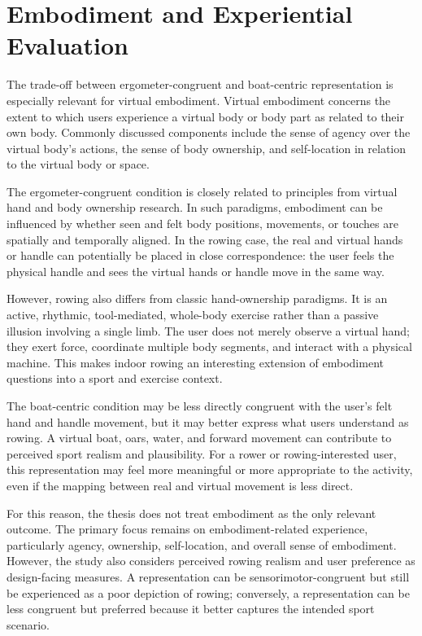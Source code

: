 \section{Embodiment and Experiential Evaluation}
\label{sec:introduction_embodiment_experience}

The trade-off between ergometer-congruent and boat-centric representation is especially relevant for virtual embodiment. Virtual embodiment concerns the extent to which users experience a virtual body or body part as related to their own body. Commonly discussed components include the sense of agency over the virtual body's actions, the sense of body ownership, and self-location in relation to the virtual body or space.

The ergometer-congruent condition is closely related to principles from virtual hand and body ownership research. In such paradigms, embodiment can be influenced by whether seen and felt body positions, movements, or touches are spatially and temporally aligned. In the rowing case, the real and virtual hands or handle can potentially be placed in close correspondence: the user feels the physical handle and sees the virtual hands or handle move in the same way.

However, rowing also differs from classic hand-ownership paradigms. It is an active, rhythmic, tool-mediated, whole-body exercise rather than a passive illusion involving a single limb. The user does not merely observe a virtual hand; they exert force, coordinate multiple body segments, and interact with a physical machine. This makes indoor rowing an interesting extension of embodiment questions into a sport and exercise context.

The boat-centric condition may be less directly congruent with the user's felt hand and handle movement, but it may better express what users understand as rowing. A virtual boat, oars, water, and forward movement can contribute to perceived sport realism and plausibility. For a rower or rowing-interested user, this representation may feel more meaningful or more appropriate to the activity, even if the mapping between real and virtual movement is less direct.

For this reason, the thesis does not treat embodiment as the only relevant outcome. The primary focus remains on embodiment-related experience, particularly agency, ownership, self-location, and overall sense of embodiment. However, the study also considers perceived rowing realism and user preference as design-facing measures. A representation can be sensorimotor-congruent but still be experienced as a poor depiction of rowing; conversely, a representation can be less congruent but preferred because it better captures the intended sport scenario.

